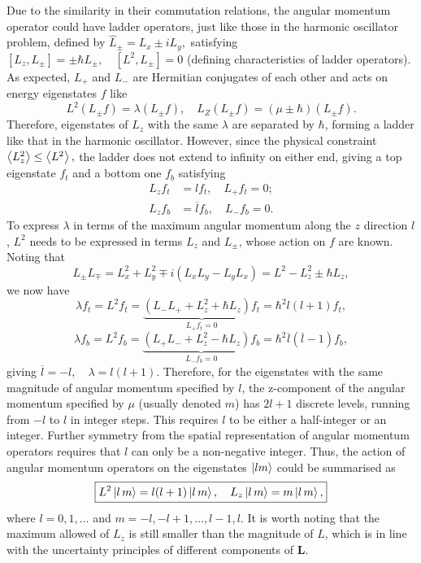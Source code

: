 \documentclass{article}
\theoremstyle{nonumberplain}
\begin{document}
Due to the similarity in their commutation relations, the angular momentum operator could have ladder operators, just like those in the harmonic oscillator problem, defined by $\boxed{\hat{L}_{\pm} = L_x \pm i L_y},$ satisfying $\boxed{[L_z, L_\pm] = \pm \hbar L_{\pm}, \quad [L^2, L_\pm] = 0 } $ (defining characteristics of ladder operators). As expected, $L_+$ and $L_-$ are Hermitian conjugates of each other and acts on energy eigenstates $f$ like 
\[
    L^2 (L_\pm f) = \lambda (L_\pm f), \quad 
    L_Z (L_\pm f) = (\mu \pm \hbar ) (L_\pm f). 
\]
Therefore, eigenstates of $L_z$ with the same $\lambda$ are separated by $\hbar$, forming a ladder like that in the harmonic oscillator. However, since the physical constraint $\expval{L_z^2} \leq \expval{L^2},$ the ladder does not extend to infinity on either end, giving a top eigenstate $f_t$ and a bottom one $f_b$ satisfying 
\[
    \begin{aligned}
        L_z f_t &= l f_t, \quad L_+ f_t = 0; \\
        L_z f_b &= \overline{l} f_b, \quad L_- f_{b} =0. 
    \end{aligned}
\]
To express $\lambda $ in terms of the maximum angular momentum along the $z$ direction $l$, $L^2$ needs to be  expressed in terms $L_z$ and $L_\pm$, whose action on $f$ are known. Noting that 
\[
    L_\pm L_\mp = L_x^2 + L_y^2 \mp i (L_x L_{y} - L_{y} L_{x} ) = L^2 - L_z^2 \pm \hbar L_z,
\]
we now have 
\[
    \lambda f_t = L^2 f_t = \underbrace{(L_- L_+ + L_z^2 + \hbar L_z ) f_t}_{L_+ f_t = 0} = \hbar ^2 l (l+1) f_t, 
\]
\[
    \lambda f_b = L^2 f_b = \underbrace{(L_+ L_- + L_z^2 - \hbar L_z ) f_b}_{L_- f_b = 0} = \hbar ^2 \overline{l}  (\overline{l} -1) f_b,
\] 
giving $ \overline{l} = -l, \quad \lambda = l(l+1).$ Therefore, for the eigenstates with the same magnitude of angular momentum specified by $l$, the z-component of the angular momentum specified by $\mu $ (usually denoted $m$) has $2l+1$ discrete levels, running from $-l$ to $l$ in integer steps. This requires $l$ to be either a half-integer or an integer. Further symmetry from the spatial representation of angular momentum operators requires that $l$ can only be a non-negative integer. Thus, the action of angular momentum operators on the eigenstates $\ket{l m}$ could be summarised as 
\[
    \boxed{
        L^2 \ket{l \, m} = l(l+1) \ket{l \, m}, \quad
        L_z \ket{l \, m} = m \ket{l \, m},
    }
\]
where $l = 0,1, \ldots $ and $m = -l, -l+1, \ldots , l-1, l $. It is worth noting that the maximum allowed of $L_z$ is still smaller than the magnitude of $L$, which is in line with the uncertainty principles of different components of $\mathbf{L}.$ 
\end{document}
